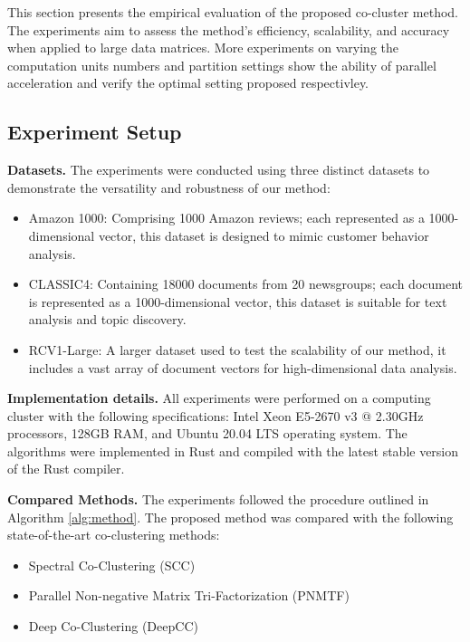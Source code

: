 \documentclass[journal]{IEEEtran}
\renewcommand{\cite}[1]{~\autocite{#1}}
\begin{document}
This section presents the empirical evaluation of the proposed co-cluster method. The experiments aim to assess the method's efficiency, scalability, and accuracy when applied to large data matrices. More experiments on varying the computation units numbers and partition settings show the ability of parallel acceleration and verify the optimal setting proposed respectivley.

\subsection{Experiment Setup}

\textbf{Datasets.}
The experiments were conducted using three distinct datasets to demonstrate the versatility and robustness of our method:

\begin{itemize}
  \item Amazon 1000: Comprising 1000 Amazon reviews; each represented as a 1000-dimensional vector, this dataset is designed to mimic customer behavior analysis.
  \item CLASSIC4: Containing 18000 documents from 20 newsgroups; each document is represented as a 1000-dimensional vector, this dataset is suitable for text analysis and topic discovery.
  \item RCV1-Large: A larger dataset used to test the scalability of our method, it includes a vast array of document vectors for high-dimensional data analysis.
\end{itemize}

\textbf{Implementation details.}
All experiments were performed on a computing cluster with the following specifications: Intel Xeon E5-2670 v3 @ 2.30GHz processors, 128GB RAM, and Ubuntu 20.04 LTS operating system. The algorithms were implemented in Rust and compiled with the latest stable version of the Rust compiler.

\textbf{Compared Methods.}
The experiments followed the procedure outlined in Algorithm \ref{alg:method}. The proposed method was compared with the following state-of-the-art co-clustering methods:

\begin{itemize}
  \item Spectral Co-Clustering (SCC) \cite{dhillon2001CoclusteringDocumentsWords}
  \item Parallel Non-negative Matrix Tri-Factorization (PNMTF)\cite{chen2023ParallelNonNegativeMatrix}
  \item Deep Co-Clustering (DeepCC)\cite{dongkuanxu2019DeepCoClustering}
\end{itemize}
\end{document}
